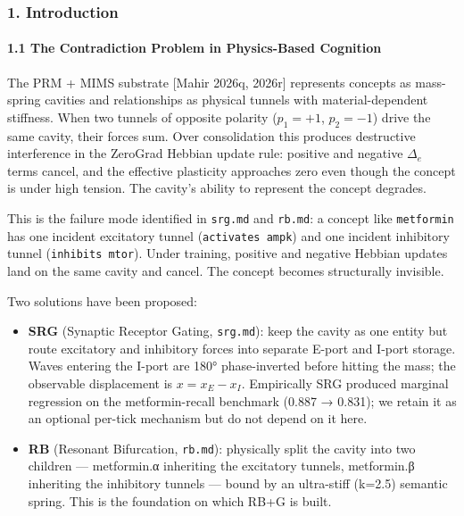 \documentclass[
  11pt,
  a4paper,
]{article}
\providecommand{\tightlist}{%
  \setlength{\itemsep}{0pt}\setlength{\parskip}{0pt}}
\begin{document}
\subsubsection{1. Introduction}\label{introduction}

\paragraph{1.1 The Contradiction Problem in Physics-Based
Cognition}\label{the-contradiction-problem-in-physics-based-cognition}

The PRM + MIMS substrate {[}Mahir 2026q, 2026r{]} represents concepts as
mass-spring cavities and relationships as physical tunnels with
material-dependent stiffness. When two tunnels of opposite polarity
(\(p_1 = +1\), \(p_2 = -1\)) drive the same cavity, their forces sum.
Over consolidation this produces destructive interference in the
ZeroGrad Hebbian update rule: positive and negative \(\Delta_e\) terms
cancel, and the effective plasticity approaches zero even though the
concept is under high tension. The cavity's ability to represent the
concept degrades.

This is the failure mode identified in \texttt{srg.md} and
\texttt{rb.md}: a concept like \texttt{metformin} has one incident
excitatory tunnel (\texttt{activates\ ampk}) and one incident inhibitory
tunnel (\texttt{inhibits\ mtor}). Under training, positive and negative
Hebbian updates land on the same cavity and cancel. The concept becomes
structurally invisible.

Two solutions have been proposed:

\begin{itemize}
\tightlist
\item
  \textbf{SRG} (Synaptic Receptor Gating, \texttt{srg.md}): keep the
  cavity as one entity but route excitatory and inhibitory forces into
  separate E-port and I-port storage. Waves entering the I-port are 180°
  phase-inverted before hitting the mass; the observable displacement is
  \(x = x_E - x_I\). Empirically SRG produced marginal regression on the
  metformin-recall benchmark (0.887 → 0.831); we retain it as an
  optional per-tick mechanism but do not depend on it here.
\item
  \textbf{RB} (Resonant Bifurcation, \texttt{rb.md}): physically split
  the cavity into two children --- metformin.α inheriting the excitatory
  tunnels, metformin.β inheriting the inhibitory tunnels --- bound by an
  ultra-stiff (k=2.5) semantic spring. This is the foundation on which
  RB+G is built.
\end{itemize}
\end{document}
